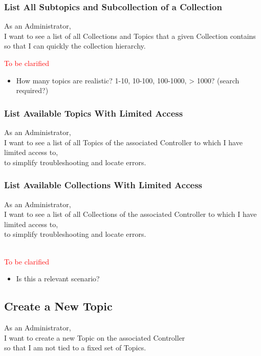 \subsubsection{List All Subtopics and Subcollection of a Collection}
As an Administrator,\\
I want to see a list of all Collections and Topics that a given Collection contains\\
so that I can quickly the collection hierarchy.

\noindent\textcolor{red}{To be clarified}

\begin{itemize}
    \item How many topics are realistic? 1-10, 10-100, 100-1000, > 1000? (search required?)
\end{itemize}

\subsubsection{List Available Topics With Limited Access}

As an Administrator,\\
I want to see a list of all Topics of the associated Controller to which I have limited access to,\\
to simplify troubleshooting and locate errors.

\subsubsection{List Available Collections With Limited Access}

As an Administrator,\\
I want to see a list of all Collections of the associated Controller to which I have limited access to,\\
to simplify troubleshooting and locate errors.


\noindent\textcolor{red}{\\To be clarified}

\begin{itemize}
    \item Is this a relevant scenario?
\end{itemize}


\subsection{Create a New Topic}

As an Administrator,\\
I want to create a new Topic on the associated Controller\\
so that I am not tied to a fixed set of Topics.

